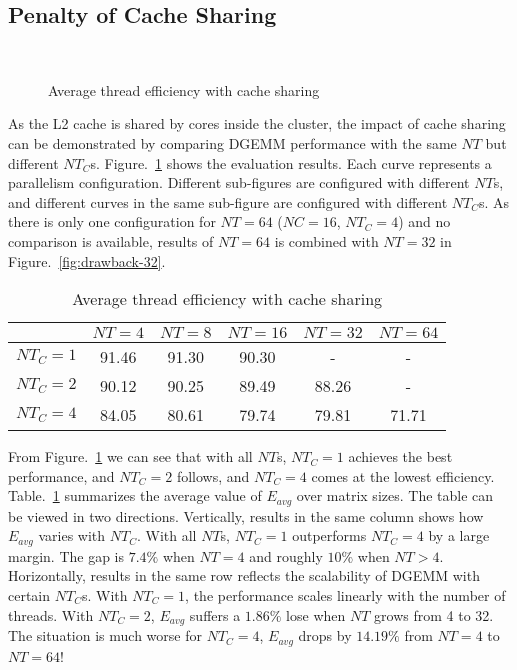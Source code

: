 \subsection{Penalty of Cache Sharing}\label{subsec:drawback}

\begin{figure}
  \centering
  \\
  \caption{Average thread efficiency with cache sharing}
  \label{fig:drawback}
\end{figure}

As the L2 cache is shared by cores inside the cluster,
the impact of cache sharing can be demonstrated
by comparing DGEMM performance with the same $NT$
but different $NT_C$s.
Figure.~\ref{fig:drawback} shows the evaluation results.
Each curve represents a parallelism configuration.
Different sub-figures are configured with different $NT$s,
and different curves in the same sub-figure are
configured with different $NT_C$s.
As there is only one configuration for $NT=64$ ($NC=16$, $NT_C=4$)
and no comparison is available,
results of $NT=64$ is combined with $NT=32$ in Figure.~\ref{fig:drawback-32}.

\begin{table}
  \centering
  \caption{Average thread efficiency with cache sharing}
  \label{tab:drawback}
  \begin{tabular}{cccccc}
    \toprule
     & $NT\!\!=\!\!4$ & $NT\!\!=\!\!8$ & $NT\!\!=\!\!16$ & $NT\!\!=\!\!32$ & $NT\!\!=\!\!64$ \\
    \midrule
    $NT_C\!\!=\!\!1$ & 91.46 & 91.30 & 90.30 & -     & - \\   
    $NT_C\!\!=\!\!2$ & 90.12 & 90.25 & 89.49 & 88.26 & - \\
    $NT_C\!\!=\!\!4$ & 84.05 & 80.61 & 79.74 & 79.81 & 71.71 \\
    \bottomrule
  \end{tabular}
\end{table}

From Figure.~\ref{fig:drawback} we can see that
with all $NT$s, $NT_C=1$ achieves the best performance,
and $NT_C=2$ follows, and $NT_C=4$ comes at the lowest efficiency.
Table.~\ref{tab:drawback} summarizes the average value
of $E_{avg}$ over matrix sizes.
The table can be viewed in two directions.
Vertically, results in the same column shows how $E_{avg}$ varies with $NT_C$.
With all $NT$s, $NT_C=1$ outperforms $NT_C=4$ by a large margin.
The gap is $7.4\%$ when $NT=4$ and roughly $10\%$ when $NT>4$.
Horizontally, results in the same row reflects the scalability of
DGEMM with certain $NT_C$s.
With $NT_C=1$, the performance scales linearly with the number of threads.
With $NT_C=2$, $E_{avg}$ suffers a $1.86\%$ lose when $NT$ grows from 4 to 32.
The situation is much worse for $NT_C=4$, $E_{avg}$ drops by $14.19\%$ from
$NT=4$ to $NT=64$!

